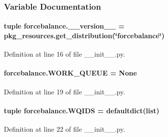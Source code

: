 \subsubsection{Variable Documentation}
\hypertarget{namespaceforcebalance_a415490bd425b364421271cb8e2ce6672}{
\paragraph[{\-\_\-\-\_\-version\-\_\-\-\_\-}]{\setlength{\rightskip}{0pt plus 5cm}tuple forcebalance.\-\_\-\-\_\-version\-\_\-\-\_\- = pkg\-\_\-resources.\-get\-\_\-distribution(\char`\"{}forcebalance\char`\"{})}}\label{namespaceforcebalance_a415490bd425b364421271cb8e2ce6672}


Definition at line 16 of file \-\_\-\-\_\-init\-\_\-\-\_\-.\-py.

\hypertarget{namespaceforcebalance_a730d54f7aa4e228b2475e31765b36b68}{
\paragraph[{W\-O\-R\-K\-\_\-\-Q\-U\-E\-U\-E}]{\setlength{\rightskip}{0pt plus 5cm}forcebalance.\-W\-O\-R\-K\-\_\-\-Q\-U\-E\-U\-E = None}}\label{namespaceforcebalance_a730d54f7aa4e228b2475e31765b36b68}


Definition at line 19 of file \-\_\-\-\_\-init\-\_\-\-\_\-.\-py.

\hypertarget{namespaceforcebalance_a582a602e14175af1441d1ec96fe9a75a}{
\paragraph[{W\-Q\-I\-D\-S}]{\setlength{\rightskip}{0pt plus 5cm}tuple forcebalance.\-W\-Q\-I\-D\-S = defaultdict(list)}}\label{namespaceforcebalance_a582a602e14175af1441d1ec96fe9a75a}


Definition at line 22 of file \-\_\-\-\_\-init\-\_\-\-\_\-.\-py.

